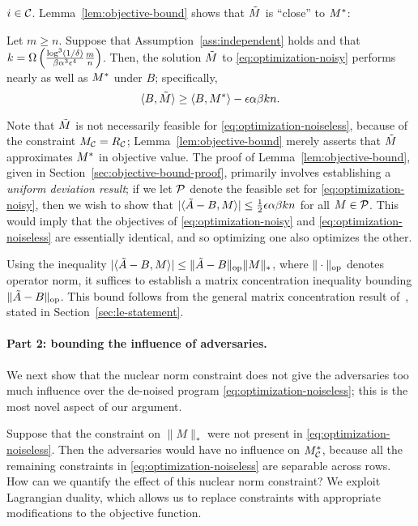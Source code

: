 $i \in \mathcal{C}$. Lemma~\ref{lem:objective-bound} shows that $\tilde{M}$ is ``close'' to $M^*$: 
\begin{lemma}
\label{lem:objective-bound}
Let $m \geq n$. Suppose that Assumption~\ref{ass:independent} holds and that 
$k = \Omega\left(  \frac{\log^3(1/\delta)}{\beta\alpha^3\epsilon^4}\frac{m}{n} \right)$. 
Then, the solution $\tilde{M}$ to \eqref{eq:optimization-noisy} performs nearly as 
well as $M^*$ under $B$; specifically,
\begin{equation}
\label{eq:objective-bound}
\langle B, \tilde{M} \rangle \geq \langle B, M^* \rangle - \epsilon \alpha\beta kn.
\end{equation}
\end{lemma}
Note that $\tilde{M}$ is not necessarily feasible for \eqref{eq:optimization-noiseless}, 
because of the constraint $M_{\mathcal{C}} = R_{\mathcal{C}}$; Lemma~\ref{lem:objective-bound} 
merely asserts that $\tilde{M}$ approximates $M^*$ in objective value. The proof of 
Lemma~\ref{lem:objective-bound}, given in Section~\ref{sec:objective-bound-proof}, 
primarily involves establishing a 
\emph{uniform deviation result}; if we let $\mathcal{P}$ denote the feasible set for 
\eqref{eq:optimization-noisy}, then we wish to show that 
$|\langle \tilde{A} - B, M \rangle| \leq \frac{1}{2}\epsilon \alpha\beta kn$ for all 
$M \in \mathcal{P}$. This would imply that the objectives of 
\eqref{eq:optimization-noisy} and \eqref{eq:optimization-noiseless} are 
essentially identical, and so optimizing one also optimizes the other.

Using the inequality $|\langle \tilde{A} - B, M \rangle| \leq \|\tilde{A}-B\|_{\mathrm{op}}\|M\|_*$, 
where $\|\cdot\|_{\mathrm{op}}$ denotes operator norm, it suffices to establish a matrix 
concentration inequality bounding $\|\tilde{A} - B\|_{\mathrm{op}}$.   
This bound follows from the general matrix concentration result of~\cite{le2015concentration},
stated in Section~\ref{sec:le-statement}.

\paragraph{Part 2: bounding the influence of adversaries.} 
We next show that the nuclear norm constraint does 
not give the adversaries too much influence over the de-noised program 
\eqref{eq:optimization-noiseless}; this is the most novel aspect 
of our argument.




Suppose that the constraint on $\|M\|_*$ were not present in 
\eqref{eq:optimization-noiseless}. Then the adversaries would have 
no influence on $M^*_{\mathcal{C}}$, because all the remaining constraints 
in \eqref{eq:optimization-noiseless} are separable across rows. 
How can we quantify the effect of this nuclear norm constraint?
We exploit Lagrangian duality, which allows us to replace constraints 
with appropriate modifications to the objective function.

